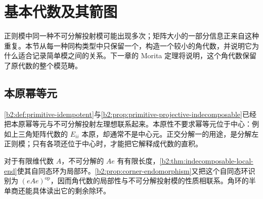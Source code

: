 
\section{基本代数及其箭图}
\label{b2:sec:1504}

正则模中同一种不可分解投射模可能出现多次；矩阵大小的一部分信息正来自这种重复。本节从每一种同构类型中只保留一个，构造一个较小的角代数，并说明它为什么适合记录简单模之间的关系。下一章的 Morita 定理将说明，这个角代数保留了原代数的整个模范畴。

%
%

\subsection{本原幂等元}
\label{b2:subsec:1504:01}

\cref{b2:def:primitive-idempotent}与\cref{b2:prop:primitive-projective-indecomposable}已经把本原幂等元与不可分解投射左理想联系起来。本原性不要求幂等元位于中心：例如上三角矩阵代数的 \(E_{ii}\) 本原，却通常不是中心元。正交分解一的用途，是分解左正则模；只有各项还位于中心时，才能把它解释成代数的直积。

\ProseParagraphBreak
对于有限维代数 \(A\)，不可分解的 \(Ae\) 有有限长度，\cref{b2:thm:indecomposable-local-end}使其自同态环为局部环。\cref{b2:prop:corner-endomorphism}又把这个自同态环识别为 \((eAe)^{\mathrm{op}}\)，因而角代数的局部性与不可分解投射模的性质相联系。角环的半单商还能具体读出它的剩余除环。

